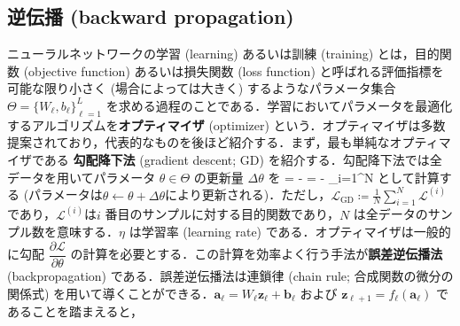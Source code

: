 \subsection{逆伝播 (backward propagation)}
ニューラルネットワークの学習 (learning) あるいは訓練 (training) とは，目的関数 (objective function) あるいは損失関数 (loss function) と呼ばれる評価指標を可能な限り小さく (場合によっては大きく) するようなパラメータ集合 $\Theta = \{W_\ell, b_\ell\}_{\ell=1}^{L}$ を求める過程のことである．学習においてパラメータを最適化するアルゴリズムを\textbf{オプティマイザ} (optimizer) という．オプティマイザは多数提案されており，代表的なものを後ほど紹介する．まず，最も単純なオプティマイザである \textbf{勾配降下法} (gradient descent; GD) を紹介する．勾配降下法では全データを用いてパラメータ $\theta \in \Theta$ の更新量 $\Delta \theta$ を 
\Delta \theta = -\eta {} = - \sum_{i=1}^N 
として計算する (パラメータは$\theta\leftarrow \theta + \Delta \theta$により更新される)．ただし，$\mathcal{L}_{\textrm{GD}}\coloneqq \frac{1}{N}\sum_{i=1}^N \mathcal{L}^{(i)}$ であり，$\mathcal{L}^{(i)}$は$i$ 番目のサンプルに対する目的関数であり，$N$ は全データのサンプル数を意味する．$\eta$ は学習率 (learning rate) である．オプティマイザは一般的に勾配 $\dfrac{\partial \mathcal{L}}{\partial \theta}$ の計算を必要とする．この計算を効率よく行う手法が\textbf{誤差逆伝播法} (backpropagation) である．誤差逆伝播法は連鎖律 (chain rule; 合成関数の微分の関係式) を用いて導くことができる．$\mathbf{a}_\ell=W_\ell \mathbf{z}_\ell +\mathbf{b}_\ell$ および $\mathbf{z}_{\ell+1}=f_\ell\left(\mathbf{a}_\ell\right)$ であることを踏まえると，
